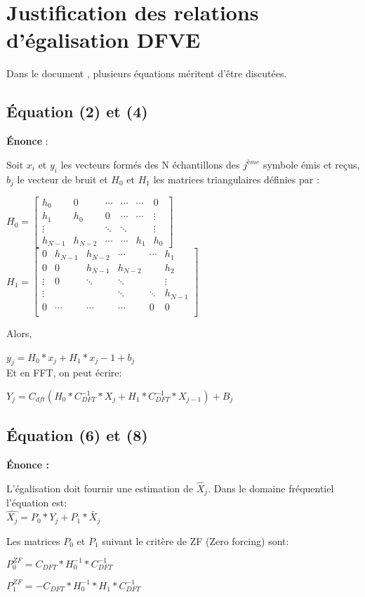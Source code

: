 
\chapter{Justification des relations d'égalisation DFVE}

Dans le document \cite{sujet}, plusieurs équations méritent d'être discutées.

\section{Équation (2) et (4)}
\label{sec:ISI}

\textbf{Énonce} :

Soit $x_i$ et $y_i$ les vecteurs formés des N échantillons des $j^{ème}$
symbole émis et reçus, $b_j$ le vecteur de bruit et $H_0$ et $H_1$ les matrices
triangulaires définies par :

$H_0=
\begin{bmatrix}
  h_0 & 0 & \cdots & \cdots & \cdots & 0 \\
  h_1 & h_0 & 0 & \cdots  & \cdots & \vdots \\
  \vdots & & \ddots & \ddots &  & \vdots \\
  h_{N-1} & h_{N-2} & \cdots & \cdots & h_1 & h_0

\end{bmatrix}
$  $H_1=
\begin{bmatrix}
  0 & h_{N-1} & h_{N-2} & \cdots & \cdots & h_1 \\
  0 & 0 & h_{N-1} & h_{N-2} &  & h_2 \\
  \vdots & 0 & \ddots & \ddots &   & \vdots \\
  \vdots &  &  & \ddots  & \ddots & h_{N-1} \\
  0 & \cdots & \cdots & \cdots & 0 & 0 \\


\end{bmatrix}
$

Alors,

$ y_j = H_0*x_j+H_1*x_j-1+b_j$
~\\

Et en FFT, on peut écrire:

$ Y_j = C_{dft}(H_0*C_{DFT}^{-1}*X_j + H_1*C_{DFT}^{-1}*X_{j-1}) + B_j$


\section{Équation (6) et (8)}

\textbf{Énonce : }

L'égalisation doit fournir une estimation de $\widehat{X_j}$. Dans le domaine
fréquentiel l'équation est:
~\\

$\widehat{X_j}= P_0*Y_j+P_1*\tilde{X_j}$

Les matrices $P_0$ et $P_1$ suivant le critère de ZF (Zero forcing) sont:

$P_0^{ZF} = C_{DFT}*H_0^{-1}*C_{DFT}^{-1}$

$P_1^{ZF} = - C_{DFT}*H_0^{-1}*H_1*C_{DFT}^{-1}$




